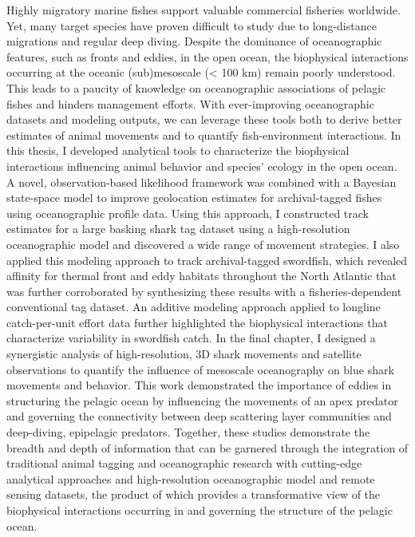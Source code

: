 Highly migratory marine fishes support valuable commercial fisheries worldwide. Yet, many target species have proven difficult to study due to long-distance migrations and regular deep diving. Despite the dominance of oceanographic features, such as fronts and eddies, in the open ocean, the biophysical interactions occurring at the oceanic (sub)mesoscale (< 100 km) remain poorly understood. This leads to a paucity of knowledge on oceanographic associations of pelagic fishes and hinders management efforts. With ever-improving oceanographic datasets and modeling outputs, we can leverage these tools both to derive better estimates of animal movements and to quantify fish-environment interactions. In this thesis, I developed analytical tools to characterize the biophysical interactions influencing animal behavior and species' ecology in the open ocean. A novel, observation-based likelihood framework was combined with a Bayesian state-space model to improve geolocation estimates for archival-tagged fishes using oceanographic profile data. Using this approach, I constructed track estimates for a large basking shark tag dataset using a high-resolution oceanographic model and discovered a wide range of movement strategies. I also applied this modeling approach to track archival-tagged swordfish, which revealed affinity for thermal front and eddy habitats throughout the North Atlantic that was further corroborated by synthesizing these results with a fisheries-dependent conventional tag dataset. An additive modeling approach applied to longline catch-per-unit effort data further highlighted the biophysical interactions that characterize variability in swordfish catch. In the final chapter, I designed a synergistic analysis of high-resolution, 3D shark movements and satellite observations to quantify the influence of mesoscale oceanography on blue shark movements and behavior. This work demonstrated the importance of eddies in structuring the pelagic ocean by influencing the movements of an apex predator and governing the connectivity between deep scattering layer communities and deep-diving, epipelagic predators. Together, these studies demonstrate the breadth and depth of information that can be garnered through the integration of traditional animal tagging and oceanographic research with cutting-edge analytical approaches and high-resolution oceanographic model and remote sensing datasets, the product of which provides a transformative view of the biophysical interactions occurring in and governing the structure of the pelagic ocean.